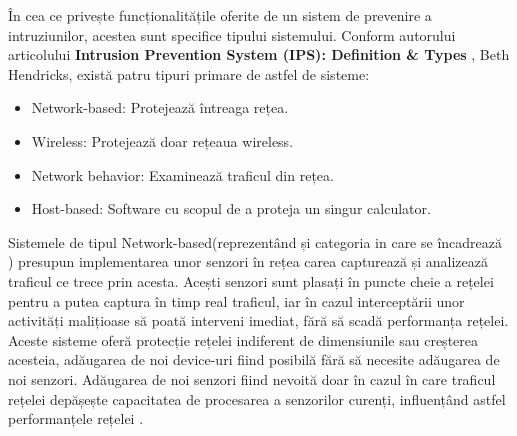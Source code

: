 În cea ce privește funcționalitățile oferite de un sistem de prevenire a intruziunilor, acestea sunt specifice tipului sistemului. Conform autorului articolului \textbf{Intrusion Prevention System (IPS): Definition \& Types} \cite{ips_types}, Beth Hendricks,  există patru tipuri primare de astfel de sisteme: 
\begin{itemize}
	\item Network-based: Protejează întreaga rețea.
	\item Wireless: Protejează doar rețeaua wireless.
	\item Network behavior: Examinează traficul din rețea.
	\item Host-based: Software cu scopul de a proteja un singur calculator.
\end{itemize}

Sistemele de tipul Network-based(reprezentând și categoria in care se încadrează  \textit{\thesistitle})  presupun implementarea unor senzori în rețea carea capturează și analizează traficul ce trece prin acesta. Acești senzori sunt plasați în puncte cheie a rețelei pentru a putea captura în timp real traficul, iar în cazul interceptării unor activități malițioase să poată interveni imediat, fără să scadă performanța rețelei. Aceste sisteme oferă protecție rețelei indiferent de dimensiunile sau creșterea acesteia, adăugarea de noi device-uri fiind posibilă fără să necesite adăugarea de noi senzori. Adăugarea de noi senzori fiind nevoită doar în cazul în care traficul rețelei depășește capacitatea de procesarea a senzorilor curenți, influențând astfel performanțele rețelei \cite{impl}.

